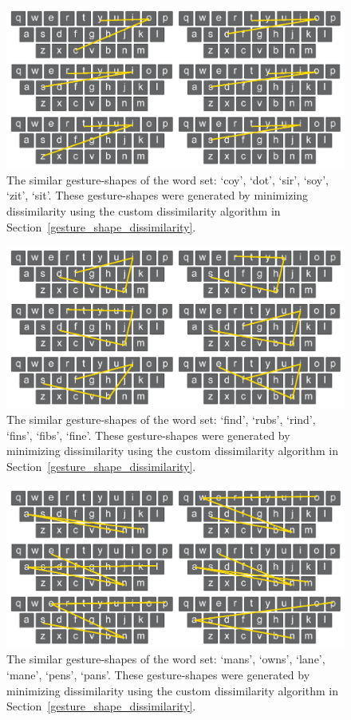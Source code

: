 \begin{figure}[b]
	\centering
	\includegraphics[width=5in]{Figures/fig_words_3}
	\caption[Word Set 3]{The similar gesture-shapes of the word set: `coy', `dot', `sir', `soy', `zit', `sit'. These gesture-shapes were generated by minimizing dissimilarity using the custom dissimilarity algorithm in Section~\ref{gesture_shape_dissimilarity}.}
	\label{fig_words_3}
\end{figure}

\clearpage

\begin{figure}[t]
	\centering
	\includegraphics[width=5in]{Figures/fig_words_4}
	\caption[Word Set 4]{The similar gesture-shapes of the word set: `find', `rubs', `rind', `fins', `fibs', `fine'. These gesture-shapes were generated by minimizing dissimilarity using the custom dissimilarity algorithm in Section~\ref{gesture_shape_dissimilarity}.}
	\label{fig_words_4}
\end{figure}

\begin{figure}[b]
	\centering
	\includegraphics[width=5in]{Figures/fig_words_5}
	\caption[Word Set 5]{The similar gesture-shapes of the word set: `mans', `owns', `lane', `mane', `pens', `pans'. These gesture-shapes were generated by minimizing dissimilarity using the custom dissimilarity algorithm in Section~\ref{gesture_shape_dissimilarity}.}
	\label{fig_words_5}
\end{figure}


